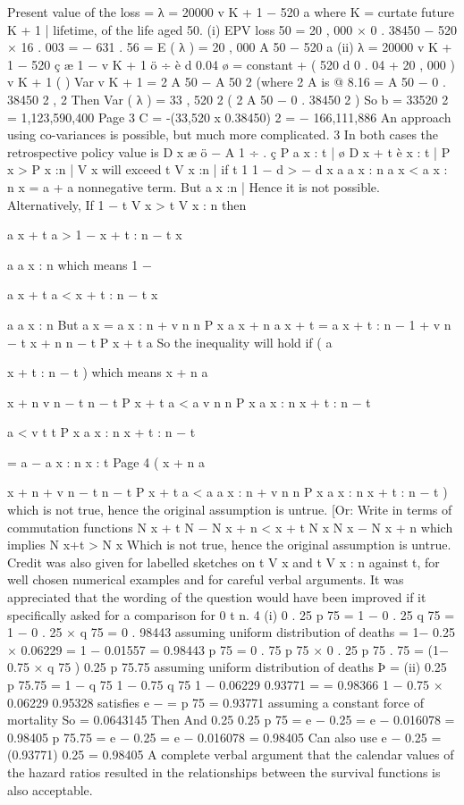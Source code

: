 Present value of the loss = λ = 20000 v K + 1 − 520 a
where K = curtate future
K + 1 |
lifetime, of the life aged 50.
(i) EPV loss
  50 = 20 , 000 × 0 . 38450 − 520 × 16 . 003 = − 631 . 56
= Ε ( λ ) = 20 , 000 A 50 − 520 a
(ii) λ = 20000 v K + 1 − 520 ç
æ 1 − v K + 1 ö
÷
è d 0.04 ø
= constant + ( 520 d 0 . 04 + 20 , 000 ) v K + 1
(
)
Var v K + 1 = 2 A 50 − A 50 2 (where 2 A is @ 8.16%
= A 50 − 0 . 38450 2 ,
2
Then Var ( λ ) = 33 , 520 2
(
2
A 50 − 0 . 38450 2
)
So b = 33520 2 = 1,123,590,400
Page 3%
C = -(33,520 x 0.38450) 2 = − 166,111,886
An approach using co-variances is possible, but much more complicated.
3
In both cases the retrospective policy value is
D x æ
ö
  − A 1 ÷ .
ç P a
x : t | ø
D x + t è x : t |
P x > P x :n |
V x will exceed t V x :n | if
t
1
1
− d >
− d
 x
a
a  x : n
a  x < a  x : n
  x = a
  + a nonnegative term.
But a
x :n |
Hence it is not possible.
Alternatively,
If
1 −
t V x
> t V x : n then

a
 x + t
a
> 1 − x + t : n − t
 x

a
a
x : n
which means
1 −

a
 x + t
a
< x + t : n − t
 x

a
a
x : n
But a  x = a  x : n + v n n P x a  x + n
a  x + t = a  x + t : n − 1 + v n − t
 x + n
n − t P x + t a
So the inequality will hold if
( a

x + t : n − t
)
which means
 x + n a


 x + n
v n − t n − t P x + t a
< a
v n n P x a
x : n
x + t : n − t


a
< v t t P x a
x : n
x + t : n − t


= a
− a
x : n
x : t
Page 4
(
 x + n a


 x + n
+ v n − t n − t P x + t a
< a
a  x : n + v n n P x a
x : n
x + t : n − t
)%
which is not true, hence the original assumption is untrue.
[Or: Write in terms of commutation functions
N x + t
N − N x + n
< x + t
N x
N x − N x + n
which implies
N x+t > N x
Which is not true, hence the original assumption is untrue.
Credit was also given for labelled sketches on t V x and t V x : n against t, for well
chosen numerical examples and for careful verbal arguments.
It was appreciated that the wording of the question would have been improved if it
specifically asked for a comparison for 0 \leq t \leq n.
4
(i)
0 . 25
p 75 = 1 − 0 . 25 q 75 = 1 − 0 . 25 × q 75 = 0 . 98443 assuming uniform distribution
of deaths
= 1− 0.25 × 0.06229 = 1 − 0.01557 = 0.98443
p 75 = 0 . 75 p 75 × 0 . 25 p 75 . 75 = (1− 0.75 × q 75 ) 0.25 p 75.75 assuming uniform
distribution of deaths
Þ
=
(ii)
0.25
p 75.75 =
1 − q 75
1 − 0.75 q 75
1 − 0.06229
0.93771
=
= 0.98366
1 − 0.75 × 0.06229 0.95328
\mu satisfies e − \mu = p 75 = 0.93771 assuming a constant force of mortality
So \mu = 0.0643145
Then
And
0.25
0.25
p 75 = e − 0.25 \mu = e − 0.016078 = 0.98405
p 75.75 = e − 0.25 \mu = e − 0.016078 = 0.98405
Can also use e − 0.25 \mu = (0.93771) 0.25 = 0.98405
A complete verbal argument that the calendar values of the hazard ratios
resulted in the relationships between the survival functions is also
acceptable.
